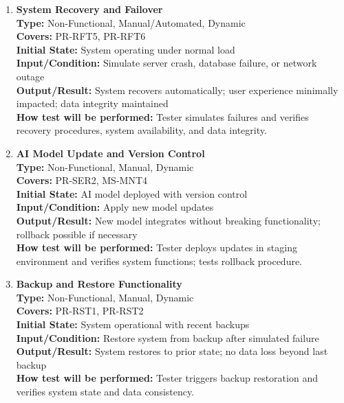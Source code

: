 \documentclass[12pt, titlepage]{article}
\begin{document}
\begin{enumerate}[label=NFR-ST \arabic*., wide=0pt, leftmargin=*]
  \item \textbf{System Recovery and Failover} \\[2mm]
    \textbf{Type:} Non-Functional, Manual/Automated, Dynamic \\
    \textbf{Covers:} PR-RFT5, PR-RFT6 \\
    \textbf{Initial State:} System operating under normal load \\
    \textbf{Input/Condition:} Simulate server crash, database
    failure, or network outage \\
    \textbf{Output/Result:} System recovers automatically; user
    experience minimally impacted; data integrity maintained \\[2mm]
    \textbf{How test will be performed:} Tester simulates failures
    and verifies recovery procedures, system availability, and data integrity.

  \item \textbf{AI Model Update and Version Control} \\[2mm]
    \textbf{Type:} Non-Functional, Manual, Dynamic \\
    \textbf{Covers:} PR-SER2, MS-MNT4 \\
    \textbf{Initial State:} AI model deployed with version control \\
    \textbf{Input/Condition:} Apply new model updates \\
    \textbf{Output/Result:} New model integrates without breaking
    functionality; rollback possible if necessary \\[2mm]
    \textbf{How test will be performed:} Tester deploys updates in
    staging environment and verifies system functions; tests rollback procedure.

  \item \textbf{Backup and Restore Functionality} \\[2mm]
    \textbf{Type:} Non-Functional, Manual, Dynamic \\
    \textbf{Covers:} PR-RST1, PR-RST2 \\
    \textbf{Initial State:} System operational with recent backups \\
    \textbf{Input/Condition:} Restore system from backup after
    simulated failure \\
    \textbf{Output/Result:} System restores to prior state; no data
    loss beyond last backup \\[2mm]
    \textbf{How test will be performed:} Tester triggers backup
    restoration and verifies system state and data consistency.


\end{enumerate}
\end{document}
